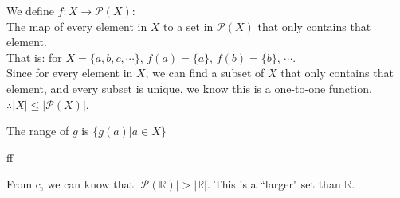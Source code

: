 \documentclass[12pt]{exam}
\begin{document}
\begin{solution}
    \begin{qparts}
        \item
        We define $f: X \rightarrow \mathcal{P}(X)$: \\
        The map of every element in $X$ to a set in $\mathcal{P}(X)$ that 
        only contains that element.\\
        That is: for $X = \{a,b,c,\cdots\}$, $f(a) = \{a\}$, $f(b) = \{b\}$, $\cdots$.\\
        Since for every element in $X$, we can find a subset of $X$ that only contains that element, 
        and every subset is unique, we know this is a one-to-one function.\\
        $\therefore |X| \leq |\mathcal{P}(X)|$.
        \item
        The range of $g$ is $\{ g(a) | a \in X\}$
        \item
        ff
        \item
        From c, we can know that $| \mathcal{P}(\mathbb{R}) | > |\mathbb{R}|$. This is a ``larger" set than $\mathbb{R}$.

    \end{qparts}
\end{solution}
\end{document}
